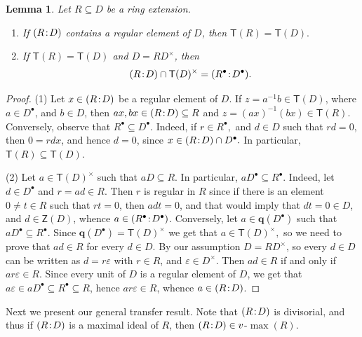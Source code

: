 \documentclass[a4paper, 10pt]{amsart}
\renewcommand{\epsilon}{\varepsilon}
\theoremstyle{plain}
\newtheorem{lemma}[theorem]{Lemma}
\theoremstyle{definition}
\theoremstyle{remark}
\newcommand{\DP}{\negthinspace : \negthinspace}
\numberwithin{equation}{section}
\begin{document}
\begin{lemma}\label{lem:totquotring}
    Let $R\subseteq D$ be a ring extension.
    \begin{enumerate}[label=\textup(\normalfont\arabic*\textup)]
        \item If $(R\DP D)$ contains a regular element of $D$, then $\mathsf{T}(R)=\mathsf{T}(D).$
        \item If $\mathsf T(R) =\mathsf T(D)$ and $D=RD^{\times}$, then $$(R\DP D)\cap \mathsf{T}(D)^\times=(R^\bullet \DP D^\bullet).$$
    \end{enumerate}
\end{lemma}
\begin{proof}
 (1) Let $x\in (R\DP D)$ be a regular element of $D$.
    If $z=a^{-1}b \in \mathsf{T}(D)$, where $a \in D^\bullet$, and $b\in D$, then $ax,bx \in (R\DP D) \subseteq  R$ and $z=(ax)^{-1}(bx)\in \mathsf{T}(R).$ 
    Conversely, observe that $R^\bullet\subseteq D^\bullet.$ Indeed, if $r\in R^\bullet,$ and $d\in D$ such that $rd=0,$ then $0=rdx$, and hence $d=0$, since $x\in (R\DP D)\cap D^\bullet.$ In particular, $\mathsf{T}(R)\subseteq \mathsf{T}(D).$

    (2) Let $a\in \mathsf{T}(D)^\times$ such that $aD\subseteq R$. In particular, $aD^\bullet\subseteq R^\bullet$. Indeed, let $d\in D^\bullet$ and $r=ad\in R$. Then $r$ is regular in $R$ since if there is an element $0 \neq t\in R$ such that $rt=0$, then $adt=0$, and that would imply that $dt=0\in D$, and $d\in \mathsf{Z}(D)$, whence $a\in (R^\bullet \DP D^\bullet)$.
		Conversely, let $a\in \mathbf{q}(D^\bullet)$ such that $aD^\bullet\subseteq R^\bullet$. Since $\mathbf q(D^{\bullet})=\mathsf T(D)^{\times}$ we get that $a\in \mathsf{T}(D)^\times,$ so we need to prove that $ad\in R$ for every $d\in D$. By our assumption $D=RD^\times$, 
		so every $d\in D$ can be written as $d=r\epsilon$ with $r\in R$, and $\epsilon\in D^\times.$ Then $ad\in R$ if and only if $ar\epsilon\in R$.
		Since every unit of $D$ is a regular element of $D$, we get that $a \epsilon \in a D^{\bullet} \subseteq R^{\bullet} \subseteq R$, hence $ar\epsilon \in R$, whence $a \in (R\DP D)$.
\end{proof}
	
 Next we present our general transfer result. Note that $(R\DP D)$ is divisorial, and thus if $(R\DP D)$ is a maximal ideal of $R$, then $(R\DP D)\in v$-$\max(R)$.
\end{document}
